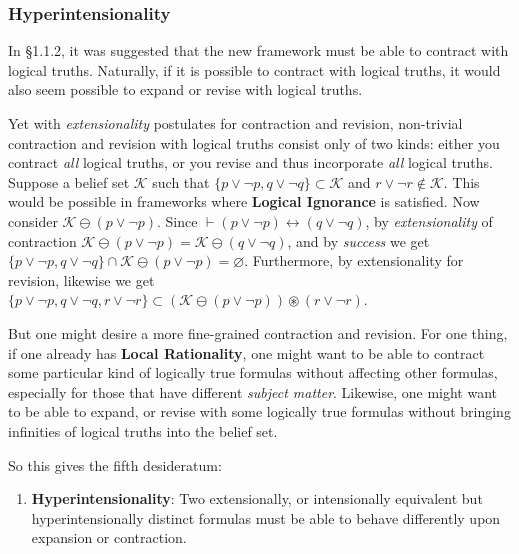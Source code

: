 \documentclass[12pt]{article}
\newcommand{\K}{\mathcal{K}}
\newcommand{\ostar}{\circledast}
\begin{document}
\subsubsection{Hyperintensionality}
In \S 1.1.2, it was suggested that the new framework must be able to contract with logical truths. Naturally, if it is possible to contract with logical truths, it would also seem possible to expand or revise with logical truths. 
\par
Yet with \textit{extensionality} postulates for contraction and revision, non-trivial contraction and revision with logical truths consist only of two kinds: either you contract \textit{all} logical truths, or you revise and thus incorporate \textit{all} logical truths. Suppose a belief set $\K$ such that  $\{p \lor \lnot p, q \lor \lnot q \} \subset \K$ and $r \lor \lnot r \notin \K$. This would be possible in frameworks where \textbf{Logical Ignorance} is satisfied. Now consider $\K \ominus (p \lor \lnot p)$. Since $\vdash (p \lor \lnot p) \leftrightarrow (q \lor \lnot q)$, by \textit{extensionality} of contraction $\K \ominus (p \lor \lnot p) = \K \ominus (q \lor \lnot q)$, and by \textit{success} we get $\{p \lor \lnot p, q \lor \lnot q \} \cap \K \ominus (p \lor \lnot p) = \varnothing$. Furthermore, by extensionality for revision, likewise we get $\{p \lor \lnot p, q \lor \lnot q, r \lor \lnot r \} \subset (\K \ominus (p \lor \lnot p)) \ostar (r \lor \lnot r)$. 
\par
But one might desire a more fine-grained contraction and revision. For one thing, if one already has \textbf{Local Rationality}, one might want to be able to contract some particular kind of logically true formulas without affecting other formulas, especially for those that have different \textit{subject matter}. Likewise, one might want to be able to expand, or revise with some logically true formulas without bringing infinities of logical truths into the belief set. 
\par
So this gives the fifth desideratum:
\begin{enumerate}
    \item[(D5)] \textbf{Hyperintensionality}: Two extensionally, or intensionally equivalent but hyperintensionally distinct formulas must be able to behave differently upon expansion or contraction.
\end{enumerate}
\end{document}
